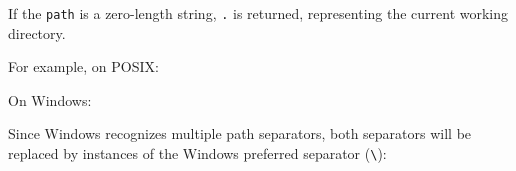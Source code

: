If the \texttt{path} is a zero-length string,
\texttt{\textquotesingle{}.\textquotesingle{}} is returned, representing
the current working directory.

For example, on POSIX:

\begin{Shaded}
\begin{Highlighting}[]
\NormalTok{(}\NormalTok{)}\OperatorTok{;}
\end{Highlighting}
\end{Shaded}

On Windows:

\begin{Shaded}
\begin{Highlighting}[]
\NormalTok{(}\SpecialCharTok{\textbackslash{}\textbackslash{}}\SpecialCharTok{\textbackslash{}\textbackslash{}\textbackslash{}\textbackslash{}}\SpecialCharTok{\textbackslash{}\textbackslash{}}\SpecialCharTok{\textbackslash{}\textbackslash{}}\SpecialCharTok{\textbackslash{}\textbackslash{}}\StringTok{\textquotesingle{}}\NormalTok{)}\OperatorTok{;}
\end{Highlighting}
\end{Shaded}

Since Windows recognizes multiple path separators, both separators will
be replaced by instances of the Windows preferred separator
(\texttt{\textbackslash{}}):

\begin{Shaded}
\begin{Highlighting}[]
\NormalTok{(}\SpecialCharTok{\textbackslash{}\textbackslash{}\textbackslash{}\textbackslash{}}\StringTok{/}\SpecialCharTok{\textbackslash{}\textbackslash{}}\StringTok{/}\SpecialCharTok{\textbackslash{}\textbackslash{}}\NormalTok{)}\OperatorTok{;}
\end{Highlighting}
\end{Shaded}

